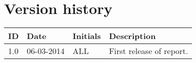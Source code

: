 \documentclass[MiniProjectMain]{subfiles}
\begin{document}
\section*{Version history}

\begin{tabular}{p{} p{} p{} p{}}
\hline
\textbf{ID} & \textbf{Date} & \textbf{Initials} & \textbf{Description}
\\
\hline
1.0 & 06-03-2014 & ALL & First release of report.
\\ \hline 
\end{tabular} 
\end{document}
